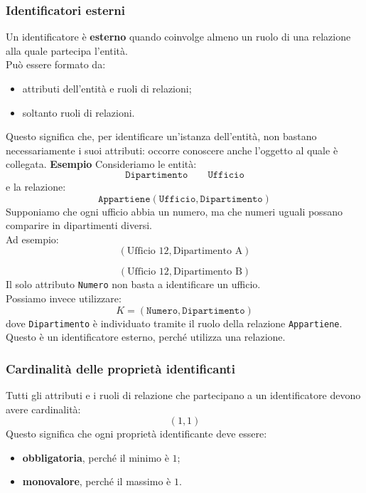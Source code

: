 \subsubsection*{Identificatori esterni}
Un identificatore è \textbf{esterno} quando
coinvolge almeno un ruolo di una relazione
alla quale partecipa l'entità.\\
Può essere formato da:
\begin{itemize}
    \item attributi dell'entità e ruoli di relazioni;
    \item soltanto ruoli di relazioni.
\end{itemize}
\noindent
Questo significa che, per identificare
un'istanza dell'entità, non bastano necessariamente
i suoi attributi: occorre conoscere anche
l'oggetto al quale è collegata.
\textcolor{verdeEsempio}{\textbf{Esempio}}
Consideriamo le entità:
\[
\texttt{Dipartimento}
\qquad
\texttt{Ufficio}
\]
e la relazione:
\[
\texttt{Appartiene}(\texttt{Ufficio},\texttt{Dipartimento})
\]
Supponiamo che ogni ufficio abbia un numero,
ma che numeri uguali possano comparire
in dipartimenti diversi.\\
Ad esempio:
\[
(\text{Ufficio } 12,\text{Dipartimento A})
\]

\[
(\text{Ufficio } 12,\text{Dipartimento B})
\]
Il solo attributo \texttt{Numero} non basta
a identificare un ufficio.\\
Possiamo invece utilizzare:
\[
\boxed{
K=(\texttt{Numero},\texttt{Dipartimento})
}
\]
dove \texttt{Dipartimento} è individuato
tramite il ruolo della relazione \texttt{Appartiene}.\\
Questo è un identificatore esterno,
perché utilizza una relazione.

\subsubsection{Cardinalità delle proprietà identificanti}
Tutti gli attributi e i ruoli di relazione
che partecipano a un identificatore
devono avere cardinalità:
\[
\boxed{(1,1)}
\]
Questo significa che ogni proprietà identificante
deve essere:
\begin{itemize}
    \item \textbf{obbligatoria}, perché il minimo è $1$;
    \item \textbf{monovalore}, perché il massimo è $1$.
\end{itemize}

